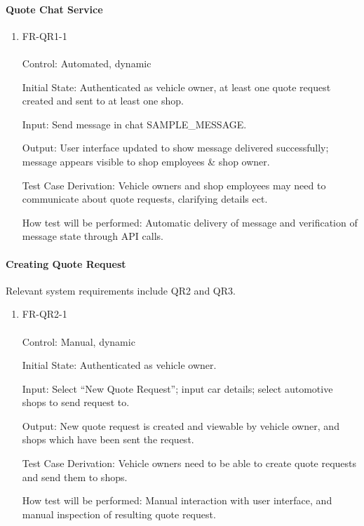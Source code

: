 \documentclass[12pt, titlepage]{article}
\begin{document}
    \paragraph{Quote Chat Service}
        \begin{enumerate}
            \item{FR-QR1-1} \\ \\
                Control: Automated, dynamic \par
                Initial State: Authenticated as vehicle owner, at least one quote request created and sent to at least one shop. \par
                Input: Send message in chat SAMPLE\_MESSAGE. \par
                Output: User interface updated to show message delivered successfully; message appears visible to shop employees \& shop owner. \par
                Test Case Derivation: Vehicle owners and shop employees may need to communicate about quote requests, clarifying details ect. \par
                How test will be performed: Automatic delivery of message and verification of message state through API calls.
        \end{enumerate}

    \paragraph{Creating Quote Request} Relevant system requirements include QR2 and QR3.
        \begin{enumerate}
            \item{FR-QR2-1} \\ \\
                Control: Manual, dynamic \par
                Initial State: Authenticated as vehicle owner. \par
                Input: Select ``New Quote Request''; input car details; select automotive shops to send request to. \par
                Output: New quote request is created and viewable by vehicle owner, and shops which have been sent the request. \par
                Test Case Derivation: Vehicle owners need to be able to create quote requests and send them to shops. \par
                How test will be performed: Manual interaction with user interface, and manual inspection of resulting quote request.
        \end{enumerate}
\end{document}
